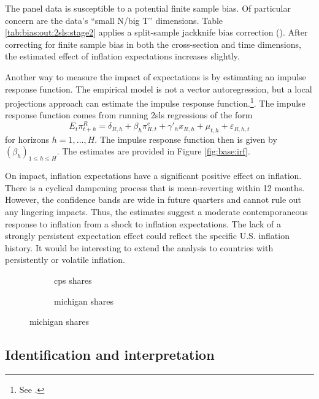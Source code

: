 \documentclass[12pt]{article}
\begin{document}
The panel data is susceptible to a potential finite sample bias. Of particular concern are the data's ``small N/big T'' dimensions. Table \ref{tab:bias:out:2sls:stage2} applies a split-sample jackknife bias correction (\cite{FernandezValWeidner:FE}). After correcting for finite sample bias in both the cross-section and time dimensions, the estimated effect of inflation expectations increases slightly.



Another way to measure the impact of expectations is by estimating an impulse response function. The empirical model is not a vector autoregression, but a local projections approach can estimate the impulse response function.\footnote{See \cite{Jorda:LP}.}. The impulse response function comes from running 2sls regressions of the form
$$ E_t\pi^R_{t+h} = \delta_{R,h} + \beta_h\pi^e_{R,t} + \gamma'_h x_{R,h} + \mu_{t,h} + \varepsilon_{R,h,t}$$
for horizons $h=1,...,H$. The impulse response function then is given by $\left(\beta_h\right)_{1\leq h\leq H}$. The estimates are provided in Figure \ref{fig:base:irf}.

On impact, inflation expectations have a significant positive effect on inflation. There is a cyclical dampening process that is mean-reverting within 12 months. However, the confidence bands are wide in future quarters and cannot rule out any lingering impacts. Thus, the estimates suggest a moderate contemporaneous response to inflation from a shock to inflation expectations. The lack of a strongly persistent expectation effect could reflect the specific U.S. inflation history. It would be interesting to extend the analysis to countries with persistently or volatile inflation.


\begin{figure}
\centering
\caption{Impulse responses}\label{fig:base:irf}
\begin{subfigure}[t]{0.475\textwidth}
\centering

\caption{cps shares}
\end{subfigure}
\quad
\begin{subfigure}[t]{0.475\textwidth}
\centering

\caption{michigan shares}
\end{subfigure}
\end{figure}

\subsection{Identification and interpretation}
\end{document}
